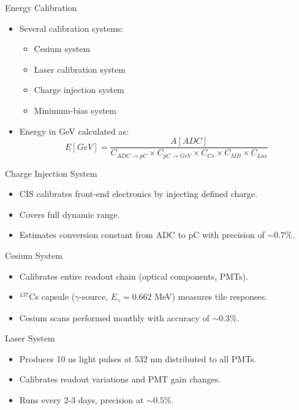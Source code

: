 \documentclass[presentation]{beamer}
\begin{document}
\begin{frame}{Energy Calibration}
    \begin{itemize}
        \item Several calibration systems:
        \begin{itemize}
            \item Cesium system
            \item Laser calibration system
            \item Charge injection system
            \item Minimum-bias system
        \end{itemize}
        \item Energy in GeV calculated as:
        \begin{equation}
            E [GeV] = \frac{A[ADC]}{C_{ADC \to pC} \times C_{pC \to GeV} \times C_{Cs} \times C_{MB} \times C_{Las}}
        \end{equation}
    \end{itemize}
\end{frame}

\begin{frame}{Charge Injection System}
    \begin{itemize}
        \item CIS calibrates front-end electronics by injecting defined charge.
        \item Covers full dynamic range.
        \item Estimates conversion constant from ADC to pC with precision of $\sim0.7\%$.
    \end{itemize}
\end{frame}

\begin{frame}{Cesium System}
    \begin{itemize}
        \item Calibrates entire readout chain (optical components, PMTs).
        \item $^{137}$Cs capsule ($\gamma$-source, $E_\gamma = 0.662$ MeV) measures tile responses.
        \item Cesium scans performed monthly with accuracy of $\sim0.3\%$.
    \end{itemize}
\end{frame}

\begin{frame}{Laser System}
    \begin{itemize}
        \item Produces 10 ns light pulses at 532 nm distributed to all PMTs.
        \item Calibrates readout variations and PMT gain changes.
        \item Runs every 2-3 days, precision at $\sim0.5\%$.
    \end{itemize}
\end{frame}
\end{document}
